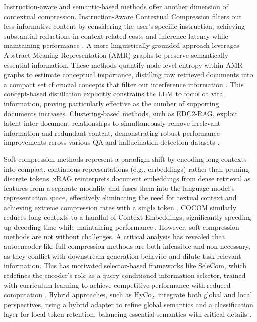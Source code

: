 \documentclass[11pt]{article}
\begin{document}
Instruction-aware and semantic-based methods offer another dimension of contextual compression. Instruction-Aware Contextual Compression filters out less informative content by considering the user's specific instruction, achieving substantial reductions in context-related costs and inference latency while maintaining performance \cite{ref160}. A more linguistically grounded approach leverages Abstract Meaning Representation (AMR) graphs to preserve semantically essential information. These methods quantify node-level entropy within AMR graphs to estimate conceptual importance, distilling raw retrieved documents into a compact set of crucial concepts that filter out interference information \cite{ref161,ref162}. This concept-based distillation explicitly constrains the LLM to focus on vital information, proving particularly effective as the number of supporting documents increases. Clustering-based methods, such as EDC2-RAG, exploit latent inter-document relationships to simultaneously remove irrelevant information and redundant content, demonstrating robust performance improvements across various QA and hallucination-detection datasets \cite{ref163}.

Soft compression methods represent a paradigm shift by encoding long contexts into compact, continuous representations (e.g., embeddings) rather than pruning discrete tokens. xRAG reinterprets document embeddings from dense retrieval as features from a separate modality and fuses them into the language model's representation space, effectively eliminating the need for textual context and achieving extreme compression rates with a single token \cite{ref164}. COCOM similarly reduces long contexts to a handful of Context Embeddings, significantly speeding up decoding time while maintaining performance \cite{ref165}. However, soft compression methods are not without challenges. A critical analysis has revealed that autoencoder-like full-compression methods are both infeasible and non-necessary, as they conflict with downstream generation behavior and dilute task-relevant information. This has motivated selector-based frameworks like SeleCom, which redefines the encoder's role as a query-conditioned information selector, trained with curriculum learning to achieve competitive performance with reduced computation \cite{ref166}. Hybrid approaches, such as HyCo\(_2\), integrate both global and local perspectives, using a hybrid adapter to refine global semantics and a classification layer for local token retention, balancing essential semantics with critical details \cite{ref167}.
\end{document}
